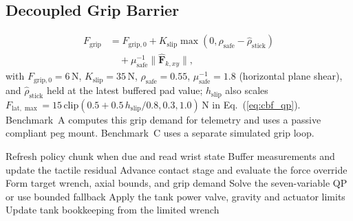\documentclass[letterpaper,10pt,conference]{IEEEtran}
\begin{document}
\subsection{Decoupled Grip Barrier}
\begin{equation}
\begin{aligned}
F_{\mathrm{grip}}&=F_{\mathrm{grip},0}+K_{\mathrm{slip}}\max(0,\rho_{\mathrm{safe}}-\hat\rho_{\mathrm{stick}})\\
&\quad+\mu_{\mathrm{safe}}^{-1}\|\hat{\mathbf F}_{k,xy}\|,
\end{aligned}
\label{eq:grip_cbf}
\end{equation}
with $F_{\mathrm{grip},0}=6$\,N, $K_{\mathrm{slip}}=35$\,N, $\rho_{\mathrm{safe}}=0.55$, $\mu_{\mathrm{safe}}^{-1}=1.8$ (horizontal plane shear), and $\hat\rho_{\mathrm{stick}}$ held at the latest buffered pad value; $h_{\mathrm{slip}}$ also scales $F_{\mathrm{lat},\max}=15\,\mathrm{clip}(0.5+0.5\,h_{\mathrm{slip}}/0.8,0.3,1.0)$\,N in Eq.~(\ref{eq:cbf_qp}). Benchmark~A computes this grip demand for telemetry and uses a passive compliant peg mount. Benchmark~C uses a separate simulated grip loop.

\begin{algorithm}[t]
\small
Refresh policy chunk when due and read wrist state\;
Buffer measurements and update the tactile residual\;
Advance contact stage and evaluate the force override\;
Form target wrench, axial bounds, and grip demand\;
Solve the seven-variable QP or use bounded fallback\;
Apply the tank power valve, gravity and actuator limits\;
Update tank bookkeeping from the limited wrench\;
\caption{One Benchmark A control tick ($\Delta t=1$\,ms).}
\end{algorithm}
\end{document}
